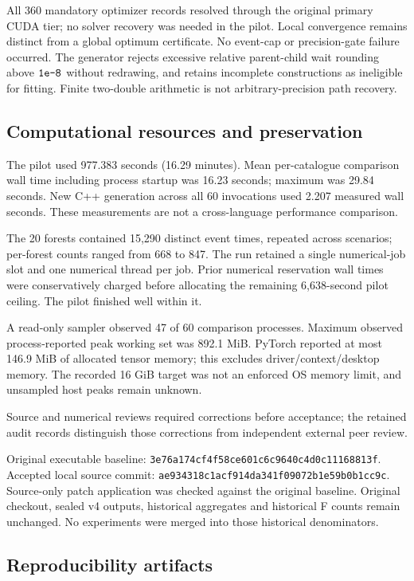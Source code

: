 All 360 mandatory optimizer records resolved through the original primary CUDA tier; no solver recovery was needed in the pilot. Local convergence remains distinct from a global optimum certificate. No event-cap or precision-gate failure occurred. The generator rejects excessive relative parent-child wait rounding above $\text{\texttt{1e-8}}$ without redrawing, and retains incomplete constructions as ineligible for fitting. Finite two-double arithmetic is not arbitrary-precision path recovery.

\subsection{Computational resources and preservation}


The pilot used 977.383 seconds (16.29 minutes). Mean per-catalogue comparison wall time including process startup was 16.23 seconds; maximum was 29.84 seconds. New C++ generation across all 60 invocations used 2.207 measured wall seconds. These measurements are not a cross-language performance comparison.

The 20 forests contained 15,290 distinct event times, repeated across scenarios; per-forest counts ranged from 668 to 847. The run retained a single numerical-job slot and one numerical thread per job. Prior numerical reservation wall times were conservatively charged before allocating the remaining 6,638-second pilot ceiling. The pilot finished well within it.

A read-only sampler observed 47 of 60 comparison processes. Maximum observed process-reported peak working set was 892.1 MiB. PyTorch reported at most 146.9 MiB of allocated tensor memory; this excludes driver/context/desktop memory. The recorded 16 GiB target was not an enforced OS memory limit, and unsampled host peaks remain unknown.

Source and numerical reviews required corrections before acceptance; the retained audit records distinguish those corrections from independent external peer review.

Original executable baseline: \nolinkurl{3e76a174cf4f58ce601c6c9640c4d0c11168813f}. Accepted local source commit: \nolinkurl{ae934318c1acf914da341f09072b1e59b0b1cc9c}. Source-only patch application was checked against the original baseline. Original checkout, sealed v4 outputs, historical aggregates and historical F counts remain unchanged. No experiments were merged into those historical denominators.

\subsection{Reproducibility artifacts}
\label{app:audit09-pilot-artifacts}


